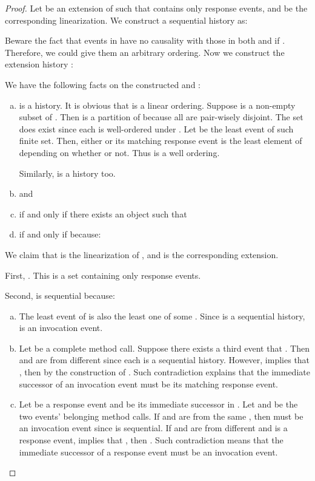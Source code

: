 \documentclass[a4paper,USenglish]{lipics-v2016}
\newcommand{\linz}{linearization}
\newcommand{\his}{\text{H}}
\newcommand{\shis}{\text{S}}
\begin{document}
\begin{proof}
	Let 
	be an extension of  such that  contains only response events, and  be the corresponding {\linz}.
	We construct a sequential history  as:
	
	
	Beware the fact that events in  have no causality with those in both  and  if .
	Therefore, we could give them an arbitrary ordering.
	Now we construct the extension history :
	
	
	We have the following facts on the constructed {\shis} and :
	\begin{enumerate}[(a)]
		\item
		{\shis} is a history. It is obvious that  is a linear ordering.
		Suppose  is a non-empty subset of .
		Then  is a partition of 
		because all  are pair-wisely disjoint.
		The set  does exist since each  is well-ordered under .
		Let  be the least event of such finite set.	
		Then, either  or its matching response event is the least element of  depending on whether  or not.
		Thus  is a well ordering.
		
		Similarly,  is a history too.
		\item
		 and 
		\item
		 if and only if there exists an object  such that 
		\item
		 if and only if  because:
		
	\end{enumerate}
	
	We claim that {\shis} is the {\linz} of {\his}, and  is the corresponding extension.
	
	First, . This is a set containing only response events.
	
	Second, {\shis} is sequential because:
	\begin{enumerate}[(a)]
		\item
		The least event  of {\shis} is also the least one of some .
		Since  is a sequential history,  is an invocation event.
		\item
		Let  be a complete method call.
		Suppose there exists a third event  that .
		Then  and  are from different  since each  is a sequential history.
		However,  implies that , then  by the construction of {\shis}.
		Such contradiction explains that the immediate successor of an invocation event must be its matching response event.
		\item
		Let  be a response event and  be its immediate successor in {\shis}.
		Let  and  be the two events' belonging method calls.
		If  and  are from the same , then  must be an invocation event since  is sequential.
		If  and  are from different  and  is a response event,
		 implies that ,
		then .
		Such contradiction means that the immediate successor of a response event must be an invocation event.
	\end{enumerate}
	

\end{proof}
\end{document}
